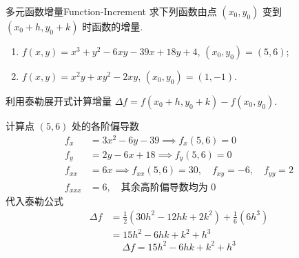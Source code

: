 \begin{problem}{多元函数增量}{Function-Increment}
    求下列函数由点 $(x_{0}, y_{0})$ 变到 $(x_{0} + h, y_{0} + k)$ 时函数的增量.
    \begin{enumerate}
        \item $f(x, y) = x^{3} + y^{2} - 6xy - 39x + 18y + 4$, $(x_{0}, y_{0}) = (5, 6)$;
        \item $f(x, y) = x^{2}y + xy^{2} - 2xy$, $(x_{0}, y_{0}) = (1, -1)$.
    \end{enumerate}
\end{problem}

\begin{solution}
    利用泰勒展开式计算增量 $\Delta f = f(x_0+h, y_0+k) - f(x_0, y_0)$.


    计算点 $(5, 6)$ 处的各阶偏导数
    \begin{equation}
        \begin{aligned}
            f_{x}   & = 3x^2 - 6y - 39 \implies f_x(5, 6) = 0                              \\
            f_{y}   & = 2y - 6x + 18 \implies f_y(5, 6) = 0                                \\
            f_{xx}  & = 6x \implies f_{xx}(5, 6) = 30, \quad f_{xy} = -6, \quad f_{yy} = 2 \\
            f_{xxx} & = 6, \quad \text{其余高阶偏导数均为 } 0
        \end{aligned}
    \end{equation}
    代入泰勒公式
    \begin{equation}
        \begin{aligned}
            \Delta f & = \frac{1}{2}(30h^2 - 12hk + 2k^2) + \frac{1}{6}(6h^3) \\
                     & = 15h^2 - 6hk + k^2 + h^3
        \end{aligned}
    \end{equation}
    \begin{equation}
        \boxed{\Delta f = 15h^2 - 6hk + k^2 + h^3}
    \end{equation}



\end{solution}
